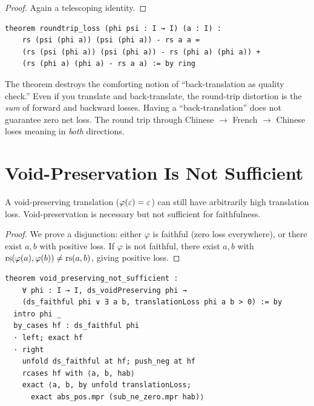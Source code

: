 \begin{proof}
Again a telescoping identity.
\end{proof}

\begin{lstlisting}
theorem roundtrip_loss (phi psi : I → I) (a : I) :
    rs (psi (phi a)) (psi (phi a)) - rs a a =
    (rs (psi (phi a)) (psi (phi a)) - rs (phi a) (phi a)) +
    (rs (phi a) (phi a) - rs a a) := by ring
\end{lstlisting}

\begin{remark}
The theorem destroys the comforting notion of ``back-translation as
quality check.''  Even if you translate and back-translate, the round-trip
distortion is the \emph{sum} of forward and backward losses.  Having a
``back-translation'' does not guarantee zero net loss.  The round trip
through Chinese $\to$ French $\to$ Chinese loses meaning in \emph{both}
directions.
\end{remark}

\section{Void-Preservation Is Not Sufficient}

\begin{theorem}
\label{thm:void-not-faithful}
A void-preserving translation ($\varphi(\varepsilon) = \varepsilon$) can still
have arbitrarily high translation loss.  Void-preservation is necessary
but not sufficient for faithfulness.
\end{theorem}

\begin{proof}
We prove a disjunction: either $\varphi$ is faithful (zero loss everywhere),
or there exist $a, b$ with positive loss.  If $\varphi$ is not faithful,
there exist $a, b$ with $\mathrm{rs}(\varphi(a), \varphi(b)) \neq \mathrm{rs}(a, b)$,
giving positive loss.
\end{proof}

\begin{lstlisting}
theorem void_preserving_not_sufficient :
    ∀ phi : I → I, ds_voidPreserving phi →
    (ds_faithful phi ∨ ∃ a b, translationLoss phi a b > 0) := by
  intro phi _
  by_cases hf : ds_faithful phi
  · left; exact hf
  · right
    unfold ds_faithful at hf; push_neg at hf
    rcases hf with ⟨a, b, hab⟩
    exact ⟨a, b, by unfold translationLoss;
      exact abs_pos.mpr (sub_ne_zero.mpr hab)⟩
\end{lstlisting}


